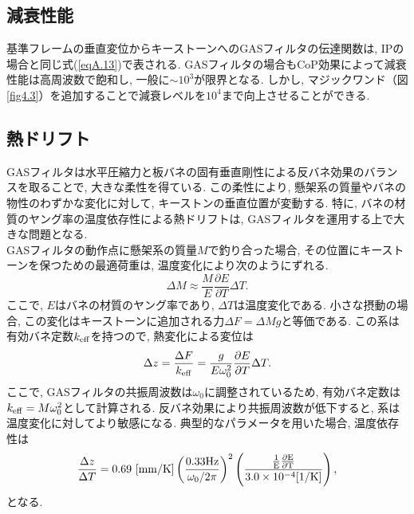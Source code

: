 \subsection{減衰性能}
基準フレームの垂直変位からキーストーンへのGASフィルタの伝達関数は, IPの場合と同じ式(\ref{eqA.13})で表される. GASフィルタの場合もCoP効果によって減衰性能は高周波数で飽和し, 一般に$\sim10^3$が限界となる\cite{attenuate}. しかし, マジックワンド（図\ref{fig4.3}）を追加することで減衰レベルを$10^4$まで向上させることができる. 
\subsection{熱ドリフト}
GASフィルタは水平圧縮力と板バネの固有垂直剛性による反バネ効果のバランスを取ることで, 大きな柔性を得ている. この柔性により, 懸架系の質量やバネの物性のわずかな変化に対して, キーストンの垂直位置が変動する. 特に, バネの材質のヤング率の温度依存性による熱ドリフトは, GASフィルタを運用する上で大きな問題となる. \\
\quad GASフィルタの動作点に懸架系の質量$M$で釣り合った場合, その位置にキーストーンを保つための最適荷重は, 温度変化により次のようにずれる. 
\begin{equation}
\Delta M\approx\frac{M}{E}\frac{\partial E}{\partial T}\Delta T.
\end{equation}
ここで, $E$はバネの材質のヤング率であり, $\Delta T$は温度変化である. 小さな摂動の場合, この変化はキーストーンに追加される力$\Delta F=\Delta Mg$と等価である. この系は有効バネ定数$k_{\rm eff}$を持つので, 熱変化による変位は
\begin{equation}
\Delta z=\frac{\Delta F}{k_{\rm eff}}=\frac{g}{E\omega_0^2}\frac{\partial E}{\partial T}\Delta T.
\end{equation}
ここで, GASフィルタの共振周波数は$\omega_0$に調整されているため, 有効バネ定数は$k_{\rm eff}=M\omega_0^2$として計算される. 反バネ効果により共振周波数が低下すると, 系は温度変化に対してより敏感になる. 典型的なパラメータを用いた場合, 温度依存性は
\begin{equation}
\frac{\Delta z}{\Delta T}=0.69\,\,[\rm{mm/K}]\left(\frac{0.33 \rm{Hz}}{\omega_0/2\pi}\right)^2\left(\frac{\frac{1}{E}\frac{\partial E}{\partial T}}{3.0\times10^{-4}[\rm{1/K}]}\right),
\end{equation}
となる. 




